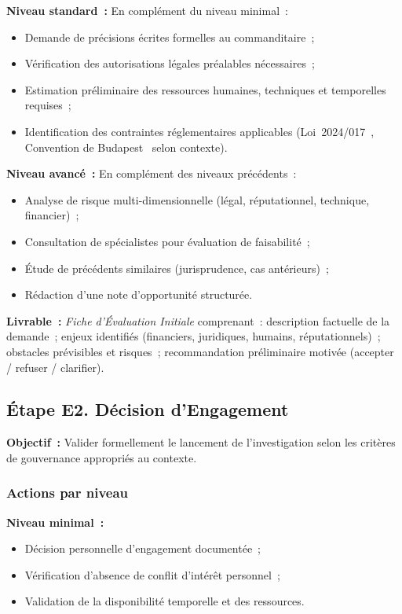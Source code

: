 \textbf{Niveau standard~:} En complément du niveau minimal~:
\begin{itemize}
    \item Demande de précisions écrites formelles au commanditaire~;
    \item Vérification des autorisations légales préalables nécessaires~;
    \item Estimation préliminaire des ressources humaines, techniques et
          temporelles requises~;
    \item Identification des contraintes réglementaires applicables
          (Loi~2024/017~\cite{cameroun2024donnees}, Convention de Budapest~\cite{budapest2001} selon contexte).
\end{itemize}

\textbf{Niveau avancé~:} En complément des niveaux précédents~:
\begin{itemize}
    \item Analyse de risque multi-dimensionnelle (légal, réputationnel,
          technique, financier)~;
    \item Consultation de spécialistes pour évaluation de faisabilité~;
    \item Étude de précédents similaires (jurisprudence, cas antérieurs)~;
    \item Rédaction d'une note d'opportunité structurée.
\end{itemize}

\textbf{Livrable~:} \textit{Fiche d'Évaluation Initiale} comprenant~:
description factuelle de la demande~; enjeux identifiés (financiers, juridiques,
humains, réputationnels)~; obstacles prévisibles et risques~;
recommandation préliminaire motivée (accepter / refuser / clarifier).

\subsection{Étape E2. Décision d'Engagement}

\textbf{Objectif~:} Valider formellement le lancement de l'investigation selon
les critères de gouvernance appropriés au contexte.

\subsubsection*{Actions par niveau}

\textbf{Niveau minimal~:}
\begin{itemize}
    \item Décision personnelle d'engagement documentée~;
    \item Vérification d'absence de conflit d'intérêt personnel~;
    \item Validation de la disponibilité temporelle et des ressources.
\end{itemize}


